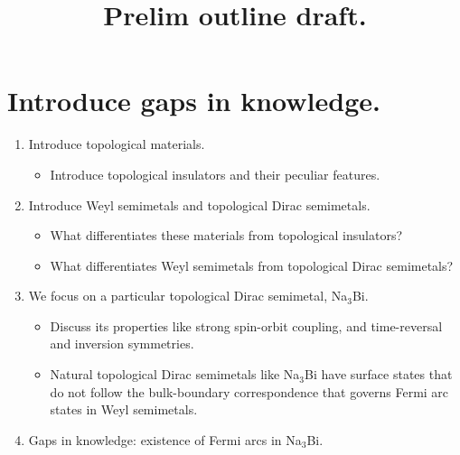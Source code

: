 \documentclass[english]{revtex4-1}
\begin{document}
\title{Prelim outline draft.}


\section{Introduce gaps in knowledge.}

\begin{enumerate}
    
    \item Introduce topological materials.

    \begin{itemize}
    
        \item Introduce topological insulators and their peculiar features.
    
    \end{itemize}
    
    \item Introduce Weyl semimetals and topological Dirac semimetals.
    
    \begin{itemize}
    
        \item What differentiates these materials from topological insulators?
    
        \item What differentiates Weyl semimetals from topological Dirac semimetals?
    
    \end{itemize}
    
    \item We focus on a particular topological Dirac semimetal, Na$_3$Bi. 
    
    \begin{itemize}
    
        \item Discuss its properties like strong spin-orbit coupling, and time-reversal and inversion symmetries.
        
       \item Natural topological Dirac semimetals like Na$_3$Bi have surface states that do not follow the bulk-boundary correspondence that governs Fermi arc states in Weyl semimetals. 
        
    \end{itemize}    

    \item Gaps in knowledge: existence of Fermi arcs in Na$_3$Bi.
    

\end{enumerate}
\end{document}
